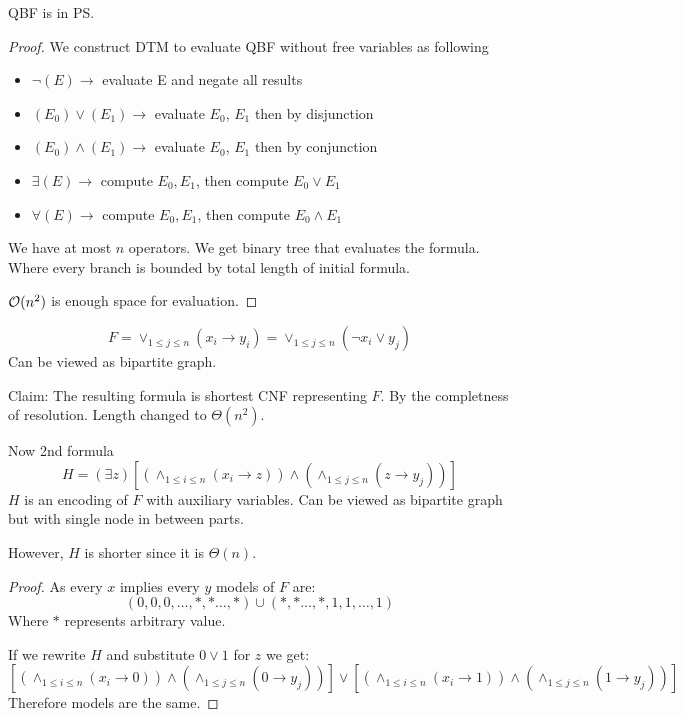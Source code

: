 \begin{theorem}
	QBF is in PS.
\end{theorem}
\begin{proof}
	We construct DTM to evaluate QBF without free variables as following
	\begin{itemize}
		\item $\neg(E) \to$ evaluate E and negate all results
		\item $(E_0) \lor (E_1) \to $ evaluate $E_0$, $E_1$ then by disjunction
		\item $(E_0) \land (E_1) \to $ evaluate $E_0$, $E_1$ then by conjunction
		\item $\exists (E) \to$ compute $E_0, E_1$, then compute $E_0 \lor E_1$
		\item $\forall(E) \to$ compute $E_0, E_1$, then compute $E_0 \land E_1$
	\end{itemize}

	We have at most $n$ operators.
	We get binary tree that evaluates the formula.
	Where every branch is bounded by total length of initial formula.

	$\mathcal{O}(n^2)$ is enough space for evaluation.
\end{proof}

\begin{example}
	\[ F = \vee_{1 \leq j \leq n} (x_i \to y_i) = \vee_{1 \leq j \leq n} (\neg x_i \lor y_j)\]
	Can be viewed as bipartite graph.

	Claim: The resulting formula is shortest CNF representing $F$.
	By the completness of resolution.
	Length changed to $\Theta(n^2)$.

	Now 2nd formula
	\[ H = (\exists z) [(\wedge_{1 \leq i \leq n}(x_i \to z)) \land (\wedge_{1 \leq j \leq n} (z \to y_j))] \]
	$H$ is an encoding of $F$ with auxiliary variables.
	Can be viewed as bipartite graph but with single node in between parts.

	However, $H$ is shorter since it is $\Theta(n)$.
\end{example}
\begin{proof}
	As every $x$ implies every $y$ models of $F$ are:
	\[ (0, 0, 0, \ldots, *, * \ldots, *) \cup (*, * \ldots, *, 1, 1, \ldots, 1)\]
	Where $*$ represents arbitrary value.

	If we rewrite $H$ and substitute $0 \lor 1$ for $z$ we get:
	\[ [(\wedge_{1 \leq i \leq n}(x_i \to 0)) \land (\wedge_{1 \leq j \leq n}(0 \to y_j))] \lor [(\wedge_{1 \leq i \leq n}(x_i \to 1)) \land (\wedge_{1 \leq j \leq n}(1 \to y_j))]\]
	Therefore models are the same.
\end{proof}


